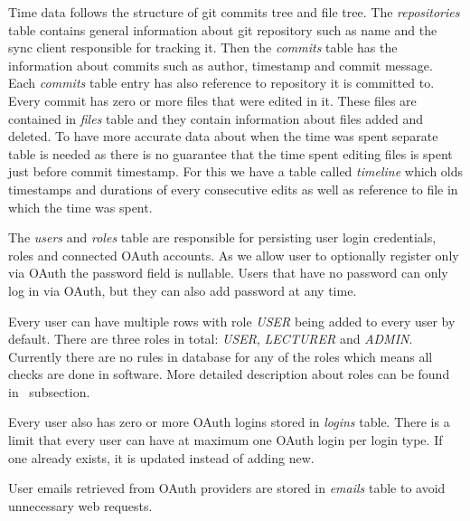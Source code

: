 Time data follows the structure of git commits tree and file tree.
The \textit{repositories} table contains general information about git repository such as name and the sync client
responsible for tracking it.
Then the \textit{commits} table has the information about commits such as author, timestamp and commit message.
Each \textit{commits} table entry has also reference to repository it is committed to.
Every commit has zero or more files that were edited in it.
These files are contained in \textit{files} table and they contain information about files added and deleted.
To have more accurate data about when the time was spent separate table is needed as there is no guarantee that
the time spent editing files is spent just before commit timestamp.
For this we have a table called \textit{timeline} which olds timestamps and durations of every consecutive edits as
well as reference to file in which the time was spent.

The \textit{users} and \textit{roles} table are responsible for persisting user login credentials, roles and connected OAuth accounts.
As we allow user to optionally register only via OAuth the password field is nullable.
Users that have no password can only log in via OAuth, but they can also add password at any time.

Every user can have multiple rows with role \textit{USER} being added to every user by default.
There are three roles in total: \textit{USER}, \textit{LECTURER} and \textit{ADMIN}.
Currently there are no rules in database for any of the roles which means all checks are done in software.
More detailed description about roles can be found in~ subsection.

Every user also has zero or more OAuth logins stored in \textit{logins} table.
There is a limit that every user can have at maximum one OAuth login per login type.
If one already exists, it is updated instead of adding new.

User emails retrieved from OAuth providers are stored in \textit{emails} table to avoid unnecessary web requests.

